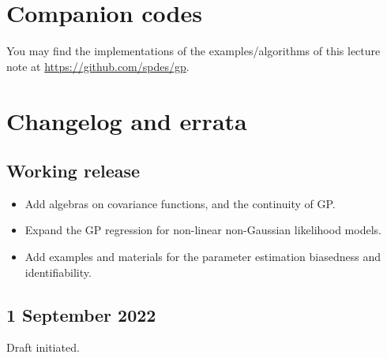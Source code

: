 \documentclass[]{article}
\begin{document}
\section{Companion codes}
You may find the implementations of the examples/algorithms of this lecture note at \url{https://github.com/spdes/gp}.

\section{Changelog and errata}

\subsection*{Working release}
\begin{itemize}
	\item Add algebras on covariance functions, and the continuity of GP.
	\item Expand the GP regression for non-linear non-Gaussian likelihood models.
	\item Add examples and materials for the parameter estimation biasedness and identifiability.
\end{itemize}

\subsection*{1 September 2022}
Draft initiated.



\end{document}
